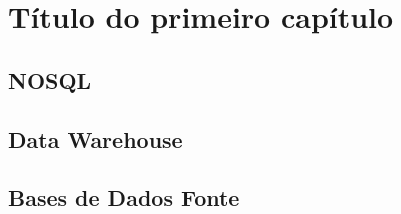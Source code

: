 \chapter{T\'itulo do primeiro cap\'itulo} \label{cap:cap1}

\section{NOSQL}
\section{Data Warehouse}
\section{Bases de Dados Fonte}
